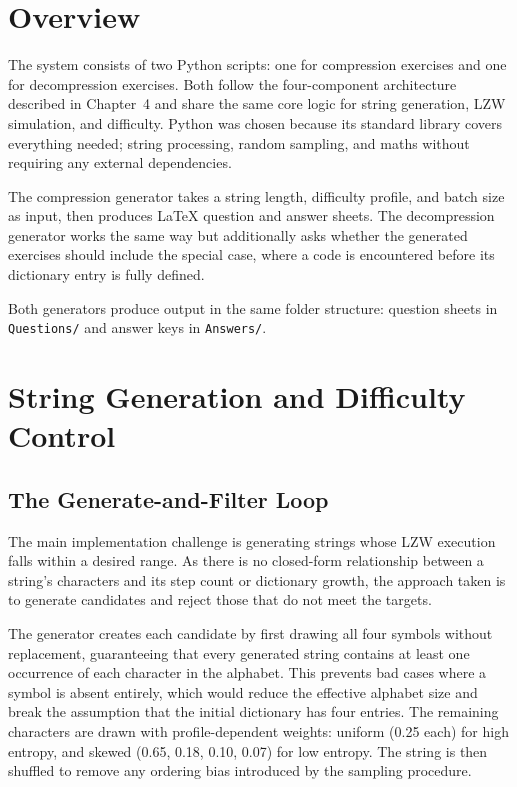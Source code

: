 \documentclass{l4proj}
\begin{document}
\section{Overview}

The system consists of two Python scripts: one for compression exercises and one for decompression exercises. Both follow the four-component architecture described in Chapter~4 and share the same core logic for string generation, LZW simulation, and difficulty. Python was chosen because its standard library covers everything needed; string processing, random sampling, and maths without requiring any external dependencies.

The compression generator takes a string length, difficulty profile, and batch size as input, then produces LaTeX question and answer sheets. The decompression generator works the same way but additionally asks whether the generated exercises should include the special case, where a code is encountered before its dictionary entry is fully defined.

Both generators produce output in the same folder structure: question sheets in \texttt{Questions/} and answer keys in \texttt{Answers/}.

\section{String Generation and Difficulty Control}

\subsection{The Generate-and-Filter Loop}

The main implementation challenge is generating strings whose LZW execution falls within a desired range. As there is no closed-form relationship between a string's characters and its step count or dictionary growth, the approach taken is to generate candidates and reject those that do not meet the targets.

The generator creates each candidate by first drawing all four symbols without replacement, guaranteeing that every generated string contains at least one occurrence of each character in the alphabet. This prevents bad cases where a symbol is absent entirely, which would reduce the effective alphabet size and break the assumption that the initial dictionary has four entries. The remaining characters are drawn with profile-dependent weights: uniform (0.25 each) for high entropy, and skewed (0.65, 0.18, 0.10, 0.07) for low entropy. The string is then shuffled to remove any ordering bias introduced by the sampling procedure.
\end{document}
